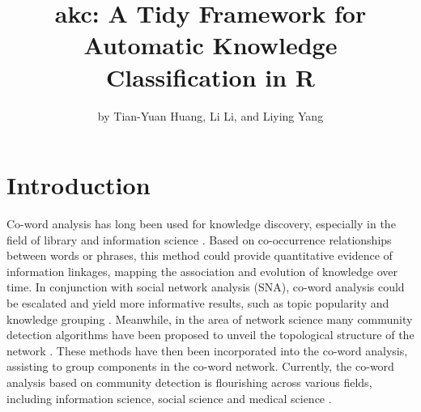\title{akc: A Tidy Framework for Automatic Knowledge Classification in
R}
\author{by Tian-Yuan Huang, Li Li, and Liying Yang}

\maketitle


\hypertarget{introduction}{%
\section{Introduction}\label{introduction}}

Co-word analysis has long been used for knowledge discovery, especially
in the field of library and information science
\citep{callon1986mapping}. Based on co-occurrence relationships between
words or phrases, this method could provide quantitative evidence of
information linkages, mapping the association and evolution of knowledge
over time. In conjunction with social network analysis (SNA), co-word
analysis could be escalated and yield more informative results, such as
topic popularity \citep{huang2019measuring} and knowledge grouping
\citep{khasseh2017intellectual}. Meanwhile, in the area of network
science many community detection algorithms have been proposed to unveil
the topological structure of the network
\citep{Fortunato-627, JavedYounis-626}. These methods have then been
incorporated into the co-word analysis, assisting to group components in
the co-word network. Currently, the co-word analysis based on community
detection is flourishing across various fields, including information
science, social science and medical science
\citep{hu2013co, hu2015research, leung2017bibliometrics, BaziyadShirazi-628}.

